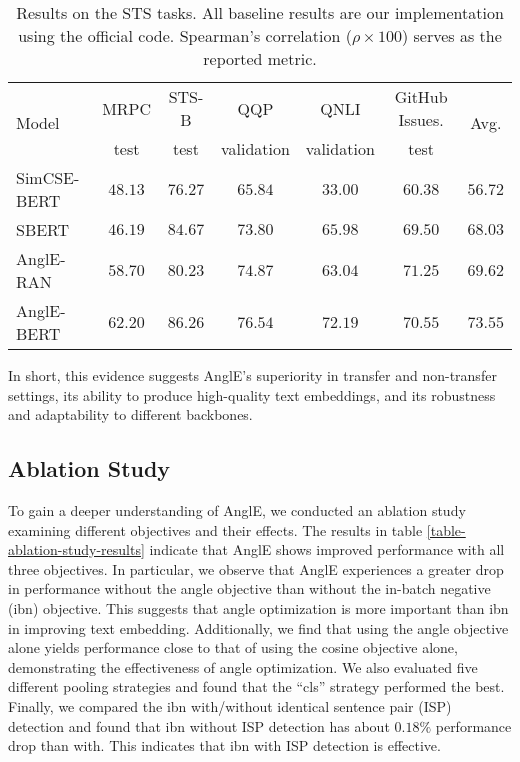 \documentclass{article} \usepackage{iclr2024_conference,times}
\begin{document}
\begin{table*}[ht]
\small
\centering
\begin{threeparttable}
\begin{tabular}{lcccccc}
\toprule
        \multirow{2}{*}{Model}   & \multicolumn{1}{c}{MRPC} & \multicolumn{1}{c}{STS-B} & 
        \multicolumn{1}{c}{QQP} & \multicolumn{1}{c}{QNLI} & \multicolumn{1}{c}{GitHub Issues.} & \multirow{2}{*}{Avg.}\\

        \cmidrule{2-6}
        &  
          \multicolumn{1}{c}{test} & \multicolumn{1}{c}{test} & 
        \multicolumn{1}{c}{validation} & \multicolumn{1}{c}{validation} &
        \multicolumn{1}{c}{test} \\
\midrule

SimCSE-BERT & $48.13$ & $76.27$ & $65.84$ & $33.00$ & $60.38$ & $56.72$ \\
SBERT & $46.19$ & $84.67$ & $73.80$ & $65.98$ & $69.50$ & $68.03$ \\

\midrule
AnglE-RAN & $58.70$ & $80.23$ & $74.87$ & $63.04$ & $\mathbf{71.25}$ & $69.62$ \\
AnglE-BERT & $\mathbf{62.20}$ & $\mathbf{86.26}$ & $\mathbf{76.54}$ & $\mathbf{72.19}$ & $70.55$ & $\mathbf{73.55}$ \\
\bottomrule
\end{tabular}
\end{threeparttable}
\caption{Results on the STS tasks. All baseline results are our implementation using the official code. Spearman's correlation ($\rho \times 100$) serves as the reported metric.} \label{table-supervised-sts-results}
\end{table*}

In short, this evidence suggests AnglE's superiority in transfer and non-transfer settings, its ability to produce high-quality text embeddings, and its robustness and adaptability to different backbones.

\subsection{Ablation Study}
To gain a deeper understanding of AnglE, we conducted an ablation study examining different objectives and their effects. The results in table \ref{table-ablation-study-results} indicate that AnglE shows improved performance with all three objectives. In particular, we observe that AnglE experiences a greater drop in performance without the angle objective than without the in-batch negative (ibn) objective. This suggests that angle optimization is more important than ibn in improving text embedding. Additionally, we find that using the angle objective alone yields performance close to that of using the cosine objective alone, demonstrating the effectiveness of angle optimization. We also evaluated five different pooling strategies and found that the ``cls'' strategy performed the best. Finally, we compared the ibn with/without identical sentence pair (ISP) detection and found that ibn without ISP detection has about $0.18\%$ performance drop than with. This indicates that ibn with ISP detection is effective.
\end{document}
